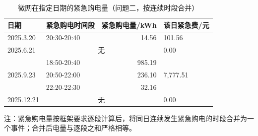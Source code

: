 \begin{table}[htbp]
  \centering
  \caption{微网在指定日期的紧急购电量（问题二，按连续时段合并）}
  \label{tab:p2-emg}
  \small
  \begin{tabular}{llrl}
    \toprule
    日期 & 紧急购电时间段 & 紧急购电量/kWh & 该日紧急费/元 \\
    \midrule
    \multirow{1}{*}{2025.3.20} & 20{:}30-20{:}40 & 14.56 & \multirow{1}{*}{101.56} \\
    \midrule
    2025.6.21 & \multicolumn{2}{c}{无} & 0.00 \\
    \multirow{3}{*}{2025.9.23} & 18{:}50-20{:}40 & 985.19 & \multirow{3}{*}{7,777.51} \\
     & 20{:}50-22{:}00 & 236.10 & \\
     & 22{:}20-22{:}30 & 32.16 & \\
    \midrule
    2025.12.21 & \multicolumn{2}{c}{无} & 0.00 \\
    \bottomrule
  \end{tabular}
  \par\vspace{2pt}
  \begin{minipage}{\textwidth}\footnotesize
    注：紧急购电量按框架要求逐段计算后，将同日连续发生紧急购电的时段合并为一个事件；合并后电量与逐段之和严格相等。
  \end{minipage}
\end{table}
